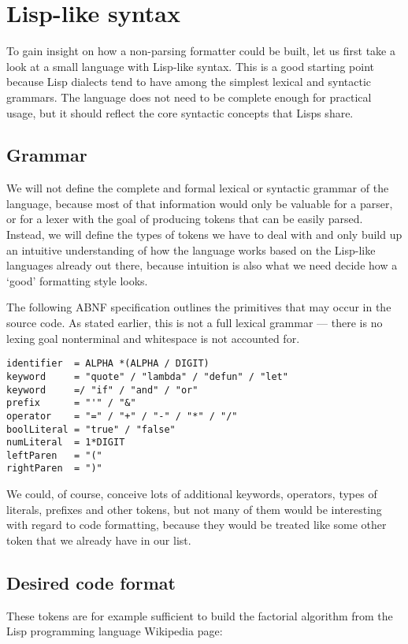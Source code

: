 \chapter{Lisp-like syntax}
To gain insight on how a non-parsing formatter could be built,
let us first take a look at a small language with Lisp-like syntax.
This is a good starting point because Lisp dialects tend to
have among the simplest lexical and syntactic grammars.
The language does not need to be complete enough for practical usage,
but it should reflect the core syntactic concepts that Lisps share.

\section{Grammar}
We will not define the complete and formal lexical or syntactic grammar of the language,
because most of that information would only be valuable for a parser,
or for a lexer with the goal of producing tokens that can be easily parsed.
Instead, we will define the types of tokens we have to deal with
and only build up an intuitive understanding of how the language works
based on the Lisp-like languages already out there,
because intuition is also what we need decide how a `good' formatting style looks.

The following ABNF specification outlines the primitives that may occur in the source code.
As stated earlier, this is not a full lexical grammar ---
there is no lexing goal nonterminal and whitespace is not accounted for.

\begin{verbatim}
identifier  = ALPHA *(ALPHA / DIGIT)
keyword     = "quote" / "lambda" / "defun" / "let"
keyword     =/ "if" / "and" / "or"
prefix      = "'" / "&"
operator    = "=" / "+" / "-" / "*" / "/"
boolLiteral = "true" / "false"
numLiteral  = 1*DIGIT
leftParen   = "("
rightParen  = ")"
\end{verbatim}

We could, of course, conceive lots of additional keywords, operators,
types of literals, prefixes and other tokens,
but not many of them would be interesting with regard to code formatting,
because they would be treated like some other token that we already have in our list.

\section{Desired code format}
These tokens are for example sufficient to build the factorial algorithm
from the Lisp programming language Wikipedia page:


